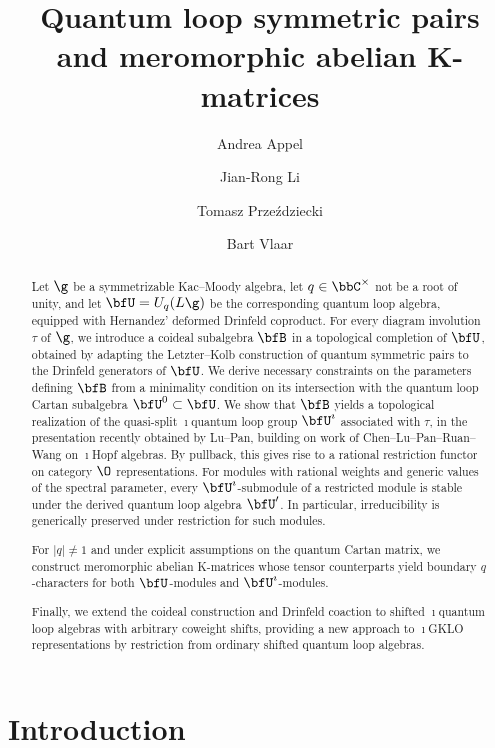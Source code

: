 \documentclass[reqno]{amsart}
\author[A.~Appel]{Andrea Appel}
\author[J.~Li]{Jian-Rong Li}
\author[T.~Prze\'{z}dziecki]{Tomasz Prze\'{z}dziecki}
\author[B.~Vlaar]{Bart Vlaar}
\title[Quantum loop symmetric pairs and abelian K-matrices]{Quantum loop symmetric pairs\\ and meromorphic abelian K-matrices}
\numberwithin{equation}{section}
\begin{document}
\maketitle\thispagestyle{empty}

\begin{abstract}
Let $\g$ be a symmetrizable Kac--Moody algebra, let $q\in\bbC^\times$ not be a root 
of unity, and let $\bfU=U_q(L\g)$ be the corresponding quantum loop algebra, equipped 
with Hernandez' deformed Drinfeld coproduct.
For every diagram involution $\tau$ of $\g$, we introduce a coideal 
subalgebra $\bfB$ in a topological completion of $\bfU$, obtained by adapting the Letzter--Kolb construction of 
quantum symmetric pairs to the Drinfeld generators of $\bfU$. 
We derive necessary constraints on the parameters defining $\bfB$ from a
minimality condition on its intersection with the quantum loop Cartan subalgebra
$\bfU^0\subset\bfU$.
We show that $\bfB$ yields a topological realization of the quasi-split $\imath$quantum 
loop group $\bfU^\imath$ associated with $\tau$, in the presentation recently obtained 
by Lu--Pan, building on work of Chen--Lu--Pan--Ruan--Wang on $\imath$Hopf 
algebras.
By pullback, this gives rise to a rational restriction functor on category $\O$
representations. For modules with rational weights and generic values of the spectral
parameter, every $\bfU^\imath$-submodule of a restricted module is stable under the
derived quantum loop algebra $\bfU'$. In particular, irreducibility is generically
preserved under restriction for such modules.

For $|q|\neq1$ and under explicit assumptions on the quantum Cartan matrix, we 
construct meromorphic abelian K-matrices whose tensor counterparts yield boundary 
$q$-characters for both $\bfU$-modules and $\bfU^\imath$-modules.

Finally, we extend the coideal construction and Drinfeld coaction to 
shifted $\imath$quantum loop algebras with arbitrary coweight shifts, providing a 
new approach to $\imath$GKLO representations by restriction from ordinary shifted 
quantum loop algebras.

\end{abstract}

\setcounter{tocdepth}{1}
\tableofcontents


\section{Introduction}\label{s:introduction}
\end{document}
